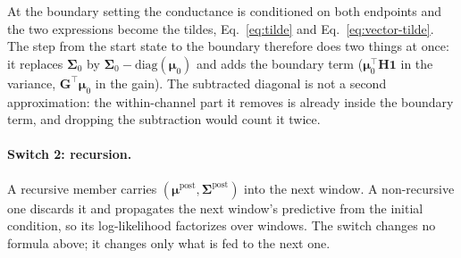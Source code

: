 \begin{appendixbox}
At the boundary setting the
conductance is conditioned on both endpoints and the two expressions become the tildes,
Eq.~\ref{eq:tilde} and Eq.~\ref{eq:vector-tilde}. The step from the start state to the
boundary therefore does two things at once: it replaces $\bm{\Sigma}_0$ by
$\bm{\Sigma}_0-\mathrm{diag}(\bm{\mu}_0)$ and adds the boundary term ($\bm{\mu}_0^\top
\mathbf{H}\mathbf{1}$ in the variance, $\mathbf{G}^\top\bm{\mu}_0$ in the gain). The
subtracted diagonal is not a second approximation: the within-channel part it removes is
already inside the boundary term, and dropping the subtraction would count it twice.

\paragraph{Switch 2: recursion.} A recursive member carries
$(\bm{\mu}^{\mathrm{post}}, \bm{\Sigma}^{\mathrm{post}})$ into the next window. A
non-recursive one discards it and propagates the next window's predictive from the initial
condition, so its log-likelihood factorizes over windows. The switch changes no formula
above; it changes only what is fed to the next one.


\end{appendixbox}
